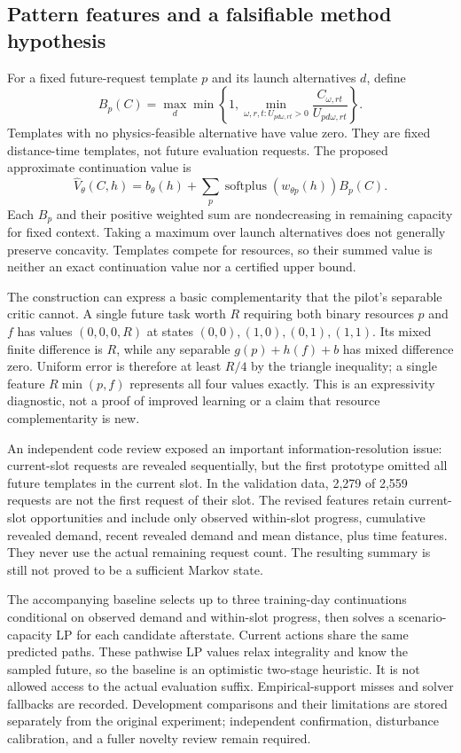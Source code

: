 \documentclass[11pt,a4paper]{article}
\begin{document}
\subsection{Pattern features and a falsifiable method hypothesis}
For a fixed future-request template $p$ and its launch alternatives $d$, define
\begin{equation}
 B_p(C)=\max_d\min\left\{1,\min_{\omega,r,t:U_{pd\omega,rt}>0}
       \frac{C_{\omega,rt}}{U_{pd\omega,rt}}\right\}.
\end{equation}
Templates with no physics-feasible alternative have value zero. They are fixed distance-time templates, not future evaluation requests. The proposed approximate continuation value is
\begin{equation}
 \widehat V_\theta(C,h)=b_\theta(h)+\sum_p\operatorname{softplus}(w_{\theta p}(h))B_p(C).
\end{equation}
Each $B_p$ and their positive weighted sum are nondecreasing in remaining capacity for fixed context. Taking a maximum over launch alternatives does not generally preserve concavity. Templates compete for resources, so their summed value is neither an exact continuation value nor a certified upper bound.

The construction can express a basic complementarity that the pilot's separable critic cannot. A single future task worth $R$ requiring both binary resources $p$ and $f$ has values $(0,0,0,R)$ at states $(0,0),(1,0),(0,1),(1,1)$. Its mixed finite difference is $R$, while any separable $g(p)+h(f)+b$ has mixed difference zero. Uniform error is therefore at least $R/4$ by the triangle inequality; a single feature $R\min(p,f)$ represents all four values exactly. This is an expressivity diagnostic, not a proof of improved learning or a claim that resource complementarity is new.

An independent code review exposed an important information-resolution issue: current-slot requests are revealed sequentially, but the first prototype omitted all future templates in the current slot. In the validation data, 2,279 of 2,559 requests are not the first request of their slot. The revised features retain current-slot opportunities and include only observed within-slot progress, cumulative revealed demand, recent revealed demand and mean distance, plus time features. They never use the actual remaining request count. The resulting summary is still not proved to be a sufficient Markov state.

The accompanying baseline selects up to three training-day continuations conditional on observed demand and within-slot progress, then solves a scenario-capacity LP for each candidate afterstate. Current actions share the same predicted paths. These pathwise LP values relax integrality and know the sampled future, so the baseline is an optimistic two-stage heuristic. It is not allowed access to the actual evaluation suffix. Empirical-support misses and solver fallbacks are recorded. Development comparisons and their limitations are stored separately from the original experiment; independent confirmation, disturbance calibration, and a fuller novelty review remain required.
\end{document}
